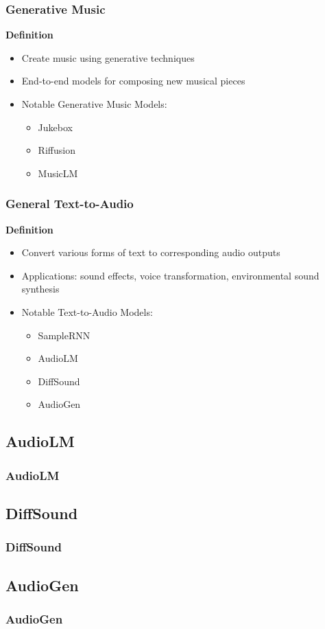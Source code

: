 \begin{frame}
    \frametitle{Generative Music}

    \textbf{Definition}
    \begin{itemize}
        \item Create music using generative techniques
        \item End-to-end models for composing new musical pieces
        \item Notable Generative Music Models:
            \begin{itemize}
                \item Jukebox
                \item Riffusion
                \item MusicLM
            \end{itemize}
    \end{itemize}

\end{frame}

\begin{frame}
    \frametitle{General Text-to-Audio}

    \textbf{Definition}
    \begin{itemize}
        \item Convert various forms of text to corresponding audio outputs
        \item Applications: sound effects, voice transformation, environmental sound synthesis
        \item Notable Text-to-Audio Models:
            \begin{itemize}
                \item SampleRNN
                \item AudioLM
                \item DiffSound
                \item AudioGen
            \end{itemize}
    \end{itemize}

\end{frame}


\subsection{AudioLM}
\begin{frame}
    \frametitle{AudioLM}
\end{frame}

\subsection{DiffSound}
\begin{frame}
    \frametitle{DiffSound}
\end{frame}

\subsection{AudioGen}
\begin{frame}
    \frametitle{AudioGen}
\end{frame}